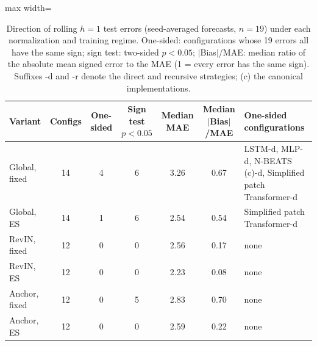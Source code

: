 \begin{table}[htbp]
\centering
\caption{Direction of rolling $h=1$ test errors (seed-averaged forecasts, $n=19$) under each normalization and training regime. One-sided: configurations whose 19 errors all have the same sign; sign test: two-sided $p<0.05$; $|$Bias$|$/MAE: median ratio of the absolute mean signed error to the MAE (1 = every error has the same sign). Suffixes -d and -r denote the direct and recursive strategies; (c) the canonical implementations.}
\label{tab:r3_bias}
\vspace{4pt}
\small
\begin{adjustbox}{max width=\textwidth}
\begin{tabular}{lccccc p{6.2cm}}
\toprule
\textbf{Variant} & \textbf{Configs} & \textbf{One-sided} & \textbf{Sign test $p<0.05$} & \textbf{Median MAE} & \textbf{Median $|$Bias$|$/MAE} & \textbf{One-sided configurations} \\
\midrule
Global, fixed & 14 & 4 & 6 & 3.26 & 0.67 & LSTM-d, MLP-d, N-BEATS (c)-d, Simplified patch Transformer-d \\
Global, ES & 14 & 1 & 6 & 2.54 & 0.54 & Simplified patch Transformer-d \\
RevIN, fixed & 12 & 0 & 0 & 2.56 & 0.17 & none \\
RevIN, ES & 12 & 0 & 0 & 2.23 & 0.08 & none \\
Anchor, fixed & 12 & 0 & 5 & 2.83 & 0.70 & none \\
Anchor, ES & 12 & 0 & 0 & 2.59 & 0.22 & none \\
\bottomrule
\end{tabular}
\end{adjustbox}
\end{table}
